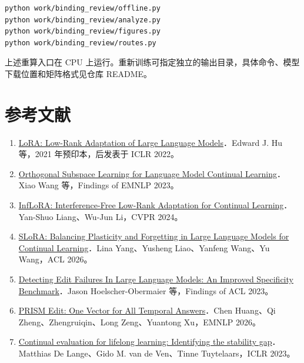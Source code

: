 \documentclass[UTF8,fontset=fandol,10pt,a4paper]{ctexart}
\begin{document}
\begin{Verbatim}[breaklines=true]
python work/binding_review/offline.py
python work/binding_review/analyze.py
python work/binding_review/figures.py
python work/binding_review/routes.py
\end{Verbatim}
上述重算入口在 CPU 上运行。重新训练可指定独立的输出目录，具体命令、模型下载位置和矩阵格式见仓库 README。



\section*{参考文献}
\begin{enumerate}
\item
\href{https://arxiv.org/abs/2106.09685}{LoRA: Low-Rank Adaptation of Large Language Models}．Edward J. Hu 等，2021 年预印本，后发表于 ICLR 2022。



\item
\href{https://aclanthology.org/2023.findings-emnlp.715/}{Orthogonal Subspace Learning for Language Model Continual Learning}．Xiao Wang 等，Findings of EMNLP 2023。



\item
\href{https://arxiv.org/abs/2404.00228}{InfLoRA: Interference-Free Low-Rank Adaptation for Continual Learning}．Yan-Shuo Liang、Wu-Jun Li，CVPR 2024。



\item
\href{https://aclanthology.org/2026.acl-long.247/}{SLoRA: Balancing Plasticity and Forgetting in Large Language Models for Continual Learning}．Lina Yang、Yusheng Liao、Yanfeng Wang、Yu Wang，ACL 2026。



\item
\href{https://aclanthology.org/2023.findings-acl.733/}{Detecting Edit Failures In Large Language Models: An Improved Specificity Benchmark}．Jason Hoelscher-Obermaier 等，Findings of ACL 2023。



\item
\href{https://aclanthology.org/2026.emnlp-main.1719/}{PRISM Edit: One Vector for All Temporal Answers}．Chen Huang、Qi Zheng、Zhengruiqin、Long Zeng、Yuantong Xu，EMNLP 2026。



\item
\href{https://arxiv.org/abs/2205.13452}{Continual evaluation for lifelong learning: Identifying the stability gap}．Matthias De Lange、Gido M. van de Ven、Tinne Tuytelaars，ICLR 2023。




\end{enumerate}
\end{document}
